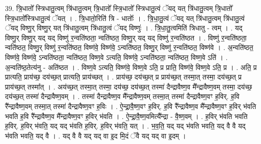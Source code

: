 \documentclass[17pt]{extarticle}
\begin{document}
39. त्रि॒धातो᳚ स्त्रिधातु॒त्वम् त्रि॑धातु॒त्वम् त्रि॒धातो᳚ स्त्रि॒धातो᳚ स्त्रिधातु॒त्वं ॅयद् यत् त्रि॑धातु॒त्वम् त्रि॒धातो᳚ स्त्रि॒धातो᳚स्त्रिधातु॒त्वं ॅयत् । . त्रि॒धातो॒रिति॑ त्रि - धातोः᳚ । . त्रि॒धा॒तु॒त्वं ॅयद् यत् त्रि॑धातु॒त्वम् त्रि॑धातु॒त्वं ॅयद् विष्णु॒र् विष्णु॒र् यत् त्रि॑धातु॒त्वम् त्रि॑धातु॒त्वं ॅयद् विष्णुः॑ । . त्रि॒धा॒तु॒त्वमिति॑ त्रिधातु - त्वम् । . यद् विष्णु॒र् विष्णु॒र् यद् यद् विष्णु॑ र॒न्वति॑ष्ठता॒ न्वति॑ष्ठत॒ विष्णु॒र् यद् यद् विष्णु॑ र॒न्वति॑ष्ठत । . विष्णु॑ र॒न्वति॑ष्ठता॒ न्वति॑ष्ठत॒ विष्णु॒र् विष्णु॑ र॒न्वति॑ष्ठत॒ विष्ण॑वे॒ विष्ण॑वे॒ ऽन्वति॑ष्ठत॒ विष्णु॒र् विष्णु॑ र॒न्वति॑ष्ठत॒ विष्ण॑वे । . अ॒न्वति॑ष्ठत॒ विष्ण॑वे॒ विष्ण॑वे॒ ऽन्वति॑ष्ठता॒ न्वति॑ष्ठत॒ विष्ण॒वे ऽत्यति॒ विष्ण॑वे॒ ऽन्वति॑ष्ठता॒ न्वति॑ष्ठत॒ विष्ण॒वे ऽति॑ । . अ॒न्वति॑ष्ठ॒तेत्य॑नु - अति॑ष्ठत । . विष्ण॒वे ऽत्यति॒ विष्ण॑वे॒ विष्ण॒वे ऽति॒ प्र प्राति॒ विष्ण॑वे॒ विष्ण॒वे ऽति॒ प्र । . अति॒ प्र प्रात्यति॒ प्राय॑च्छ॒ दय॑च्छ॒त् प्रात्यति॒ प्राय॑च्छत् । . प्राय॑च्छ॒ दय॑च्छ॒त् प्र प्राय॑च्छ॒त् तस्मा॒त् तस्मा॒ दय॑च्छ॒त् प्र प्राय॑च्छ॒त् तस्मा᳚त् । . अय॑च्छ॒त् तस्मा॒त् तस्मा॒ दय॑च्छ॒ दय॑च्छ॒त् तस्मा॑ दैन्द्रावैष्ण॒व मै᳚न्द्रावैष्ण॒वम् तस्मा॒ दय॑च्छ॒ दय॑च्छ॒त् तस्मा॑ दैन्द्रावैष्ण॒वम् । . तस्मा॑ दैन्द्रावैष्ण॒व मै᳚न्द्रावैष्ण॒वम् तस्मा॒त् तस्मा॑ दैन्द्रावैष्ण॒वꣳ ह॒विर्. ह॒वि रै᳚न्द्रावैष्ण॒वम् तस्मा॒त् तस्मा॑ दैन्द्रावैष्ण॒वꣳ ह॒विः । . ऐ॒न्द्रा॒वै॒ष्ण॒वꣳ ह॒विर्. ह॒वि रै᳚न्द्रावैष्ण॒व मै᳚न्द्रावैष्ण॒वꣳ ह॒विर् भ॑वति भवति ह॒वि रै᳚न्द्रावैष्ण॒व मै᳚न्द्रावैष्ण॒वꣳ ह॒विर् भ॑वति । . ऐ॒न्द्रा॒वै॒ष्ण॒वमित्यै᳚न्द्रा - वै॒ष्ण॒वम् । . ह॒विर् भ॑वति भवति ह॒विर्. ह॒विर् भ॑वति॒ यद् यद् भ॑वति ह॒विर्. ह॒विर् भ॑वति॒ यत् । . भ॒व॒ति॒ यद् यद् भ॑वति भवति॒ यद् वै वै यद् भ॑वति भवति॒ यद् वै । . यद् वै वै यद् यद् वा इ॒द मि॒दं ॅवै यद् यद् वा इ॒दम् । \newline
\end{document}
